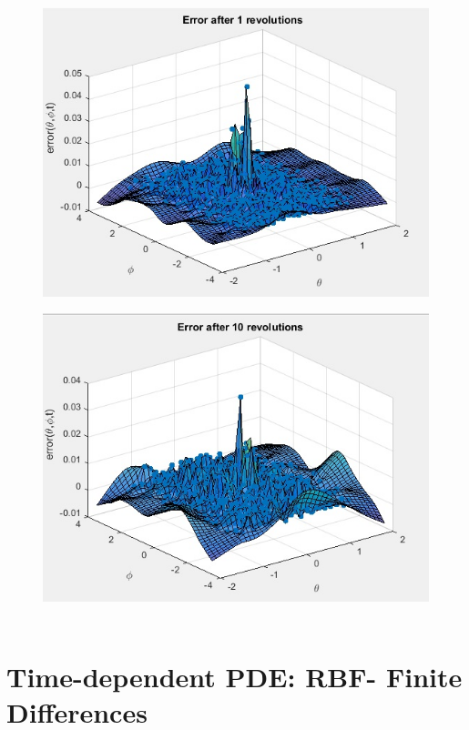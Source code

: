 \documentclass[11pt]{article}
\begin{document}
\begin{figure}[h!]
\centering
\begin{minipage}{.5\linewidth}
  \centering
\includegraphics[scale=0.7]{error1rev.jpg}
\label{fig:global1rev}
\end{minipage}%

\begin{minipage}{.5\linewidth}
  \centering
\includegraphics[scale=0.7]{error10rev.jpg}
\label{fig:global10rev}\
\end{minipage}
\end{figure}




\section{Time-dependent PDE: RBF- Finite Differences}
\end{document}
